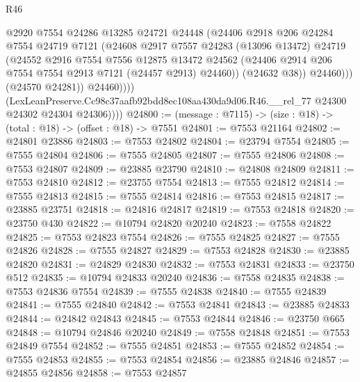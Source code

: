 \begin{lexlean}{R46}
\begin{coremodule}
                        @2920
                        @7554
                        @24286
                        @13285
                        @24721
                        @24448
                        (@24406
                          @2918
                          @206
                          @24284
                          @7554
                          @24719
                          @7121
                          (@24608
                            @2917
                            @7557
                            @24283
                            (@13096 @13472)
                            @24719
                            (@24552
                              @2916
                              @7554
                              @7556
                              @12875
                              @13472
                              @24562
                              (@24406 @2914 @206 @7554 @7554 @2913 @7121 (@24457 @2913) @24460))
                            (@24632 @38))
                          @24460)))
                    (@24570 @24281))
                  @24460))))
          (LexLeanPreserve.Cc98c37aafb92bdd8ec108aa430da9d06.R46.__rel_77
            @24300
            @24302
            @24304
            @24306))))
@24800 := (message : @7115) -> (size : @18) -> (total : @18) -> (offset : @18) -> @7551
@24801 := @7553 @21164
@24802 := @24801 @23886
@24803 := @7553 @24802
@24804 := @23794 @7554
@24805 := @7555 @24804
@24806 := @7555 @24805
@24807 := @7555 @24806
@24808 := @7553 @24807
@24809 := @23885 @23790
@24810 := @24808 @24809
@24811 := @7553 @24810
@24812 := @23755 @7554
@24813 := @7555 @24812
@24814 := @7555 @24813
@24815 := @7555 @24814
@24816 := @7553 @24815
@24817 := @23885 @23751
@24818 := @24816 @24817
@24819 := @7553 @24818
@24820 := @23750 @430
@24822 := @10794 @24820 @20240
@24823 := @7558 @24822
@24825 := @7553 @24823 @7554
@24826 := @7555 @24825
@24827 := @7555 @24826
@24828 := @7555 @24827
@24829 := @7553 @24828
@24830 := @23885 @24820
@24831 := @24829 @24830
@24832 := @7553 @24831
@24833 := @23750 @512
@24835 := @10794 @24833 @20240
@24836 := @7558 @24835
@24838 := @7553 @24836 @7554
@24839 := @7555 @24838
@24840 := @7555 @24839
@24841 := @7555 @24840
@24842 := @7553 @24841
@24843 := @23885 @24833
@24844 := @24842 @24843
@24845 := @7553 @24844
@24846 := @23750 @665
@24848 := @10794 @24846 @20240
@24849 := @7558 @24848
@24851 := @7553 @24849 @7554
@24852 := @7555 @24851
@24853 := @7555 @24852
@24854 := @7555 @24853
@24855 := @7553 @24854
@24856 := @23885 @24846
@24857 := @24855 @24856
@24858 := @7553 @24857

\end{coremodule}
\end{lexlean}
